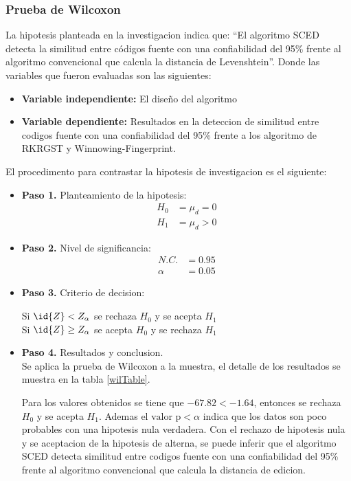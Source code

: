 \subsubsection{Prueba de Wilcoxon}
La hipotesis planteada en la investigacion indica que: ``El algoritmo SCED detecta la similitud entre códigos fuente con una confiabilidad del 95\% frente al algoritmo convencional que calcula la distancia de Levenshtein''. Donde las variables que fueron evaluadas son las siguientes:
\begin{itemize}
  \item[] \textbf{Variable independiente:} El diseño del algoritmo 
  \item[] \textbf{Variable dependiente:} Resultados en la deteccion de similitud entre codigos fuente con una confiabilidad del 95\% frente a los algoritmo de RKRGST y Winnowing-Fingerprint.
\end{itemize}

El procedimento para contrastar la hipotesis de investigacion es el siguiente:
\begin{itemize}
  \item[] \textbf{Paso 1.} Planteamiento de la hipotesis:
  \begin{equation*}
  \begin{split}
  H_0 & = \mu_d = 0 \\
  H_1 & = \mu_d > 0
  \end{split}
  \end{equation*}
  \item[] \textbf{Paso 2.} Nivel de significancia:
  \begin{equation*}
  \begin{split}
  N.C. & = 0.95 \\
  \alpha & = 0.05
  \end{split}
  \end{equation*}
  \item[] \textbf{Paso 3.} Criterio de decision:
  \begin{center}
  Si $\id{Z} < Z_\alpha$ se rechaza $H_0$ y se acepta $H_1$\\
  Si $\id{Z} \geq Z_\alpha$ se acepta $H_0$ y se rechaza $H_1$
  \end{center}
  \item[] \textbf{Paso 4.} Resultados y conclusion.\\
  Se aplica la prueba de Wilcoxon a la muestra, el detalle de los resultados se muestra en la tabla \ref{wilTable}.
  
  
  Para los valores obtenidos se tiene que $-67.82 < -1.64$, entonces se rechaza $H_0$ y se acepta $H_1$. Ademas el $\text{valor p} < \alpha$ indica que los datos son poco probables con una hipotesis nula verdadera. Con el rechazo de hipotesis nula y se aceptacion de la hipotesis de alterna, se puede inferir que el algoritmo SCED detecta similitud entre codigos fuente con una confiabilidad del 95\% frente al algoritmo convencional que calcula la distancia de edicion.
\end{itemize}
